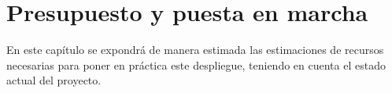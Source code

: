 %
%
%

\chapter{Presupuesto y puesta en marcha} \label{chap:presupuesto} 

En este capítulo se expondrá de manera estimada las estimaciones de recursos necesarias para poner en práctica este despliegue, teniendo en cuenta el estado actual del proyecto. 

